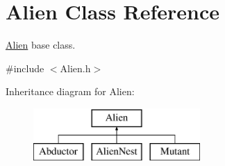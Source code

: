 \hypertarget{class_alien}{}\section{Alien Class Reference}
\label{class_alien}


\hyperlink{class_alien}{Alien} base class.  




{\ttfamily \#include $<$Alien.\+h$>$}

Inheritance diagram for Alien\+:\begin{figure}[H]
\begin{center}
\leavevmode
\includegraphics[height=2.000000cm]{class_alien}
\end{center}
\end{figure}
